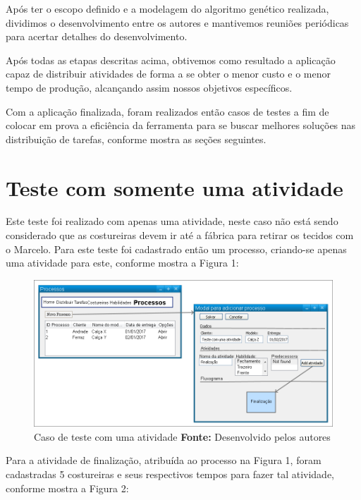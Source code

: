 \par Após ter o escopo definido e a modelagem do algoritmo genético realizada, dividimos o desenvolvimento entre os autores
e mantivemos reuniões periódicas para acertar detalhes do desenvolvimento.

\par Após todas as etapas descritas acima, obtivemos como resultado a aplicação capaz de distribuir atividades de forma a se obter o 
menor custo e o menor tempo de produção, alcançando assim nossos objetivos específicos. 

\par Com a aplicação finalizada, foram realizados então casos de testes a fim de colocar em prova a eficiência da ferramenta para se 
buscar melhores soluções nas distribuição de tarefas, conforme mostra as seções
seguintes.


\section{Teste com somente uma atividade}
\par Este teste foi realizado com apenas uma atividade, neste caso não está sendo considerado que as costureiras devem ir 
até a fábrica para retirar os tecidos com o Marcelo. Para este teste foi cadastrado então um processo, criando-se apenas uma atividade para 
este, conforme mostra a Figura 1:

\begin{figure}[h!]
	\centerline{\includegraphics[scale=0.4]{./imagens/test_case_1.png}}
	\caption[Caso de teste]
	{Caso de teste com uma atividade \textbf{Fonte:} Desenvolvido pelos autores}
	\label{fig:exemplo1}
\end{figure}

\par Para a atividade de finalização, atribuída ao processo na Figura 1, foram
cadastradas 5 costureiras e seus respectivos tempos para fazer tal atividade,
conforme mostra a Figura 2:

